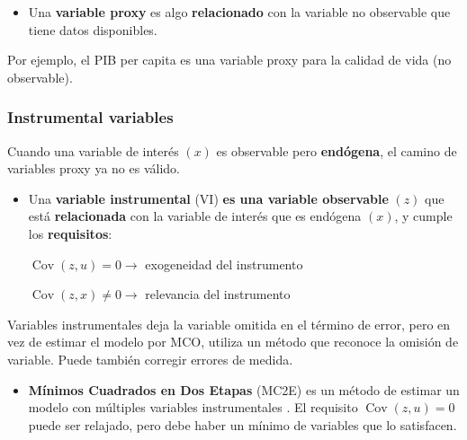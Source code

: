\documentclass[10pt, a4paper, landscape]{article}
\DeclareMathOperator{\Cov}{Cov}
\begin{document}
\begin{multicols}{3}
\begin{itemize}[leftmargin=*]
	\item Una \textbf{variable proxy} es algo \textbf{relacionado} con la variable no observable que tiene datos disponibles.
\end{itemize}

Por ejemplo, el PIB per capita es una variable proxy para la calidad de vida (no observable).

\subsubsection*{Instrumental variables}

Cuando una variable de interés \( (x) \) es observable pero \textbf{endógena}, el camino de variables proxy ya no es válido.

\begin{itemize}[leftmargin=*]
	\item Una \textbf{variable instrumental} (VI) \textbf{es una variable observable} \( (z) \) que está \textbf{relacionada} con la variable de interés que es endógena \( (x) \), y cumple los \textbf{requisitos}:
	\begin{center}
		\( \Cov(z, u) = 0 \rightarrow \) exogeneidad del instrumento

		\( \Cov(z, x) \neq 0 \rightarrow \) relevancia del instrumento
	\end{center}
\end{itemize}

Variables instrumentales deja la variable omitida en el término de error, pero en vez de estimar el modelo por MCO, utiliza un método que reconoce la omisión de variable. Puede también corregir errores de medida.

\begin{itemize}[leftmargin=*]
	\item \textbf{Mínimos Cuadrados en Dos Etapas} (MC2E) es un método de estimar un modelo con múltiples variables instrumentales . El requisito \( \Cov(z, u) = 0 \) puede ser relajado, pero debe haber un mínimo de variables que lo satisfacen.


\end{itemize}
\end{multicols}
\end{document}
